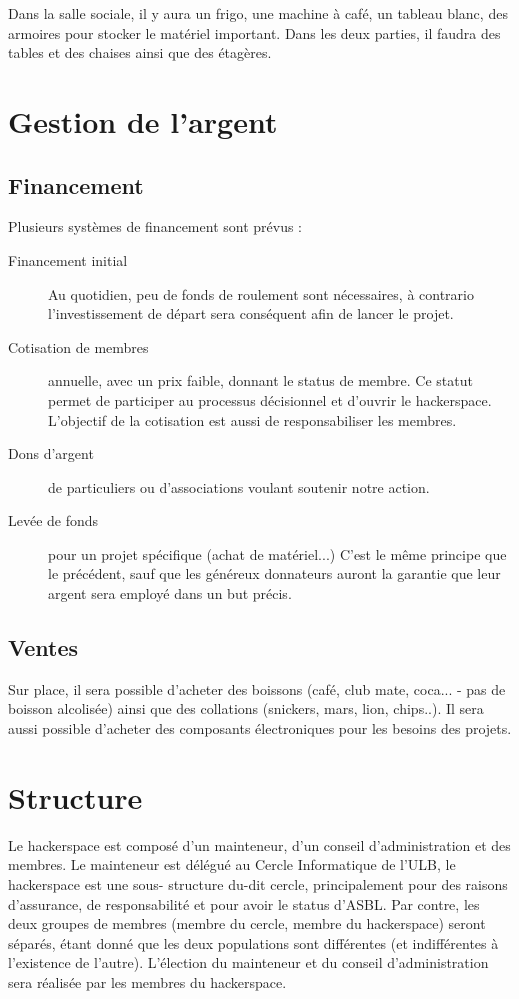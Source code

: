 \documentclass{article}
\begin{document}
Dans la salle sociale, il y aura un frigo, une machine à café, un tableau blanc, 
des armoires pour stocker le matériel important. Dans les deux parties, il faudra des tables et des chaises ainsi que des étagères.

\section{Gestion de l'argent}
\subsection{Financement}

Plusieurs systèmes de financement sont prévus :
\begin{description}
\item[Financement initial]
Au quotidien, peu de fonds de roulement sont nécessaires, à contrario l'investissement de départ sera conséquent afin de lancer le projet.
\item[Cotisation de membres] annuelle, avec un prix faible, donnant le status de membre. 
Ce statut permet de participer au processus décisionnel et d'ouvrir le hackerspace.
L'objectif de la cotisation est aussi de responsabiliser les membres.
\item[Dons d'argent] de particuliers ou d'associations voulant soutenir notre action.
\item[Levée de fonds] pour un projet spécifique (achat de matériel...) C'est 
le même principe que le précédent, sauf que les généreux donnateurs auront la 
garantie que leur argent sera employé dans un but précis.\end{description}

\subsection{Ventes}

Sur place, il sera possible d'acheter des boissons (café, club mate, coca... - 
pas de boisson alcolisée) ainsi que des collations (snickers, mars, lion, chips..).
Il sera aussi possible d'acheter des composants électroniques pour les besoins des projets.


\section{Structure}

Le hackerspace est composé d'un mainteneur, d'un conseil d'administration et des membres.
Le mainteneur est délégué au Cercle Informatique de l'ULB, le hackerspace est 
une sous- structure du-dit cercle, principalement pour des raisons d'assurance,
de responsabilité et pour avoir le status d'ASBL. Par contre, les deux groupes de 
membres (membre du cercle, membre du hackerspace) seront séparés, étant donné que 
les deux populations sont différentes (et indifférentes à l'existence de l'autre). 
L'élection du mainteneur et du conseil d'administration sera réalisée par les 
membres du hackerspace.
\end{document}

